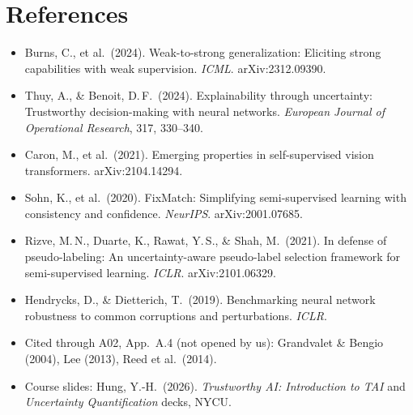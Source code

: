 \documentclass[10pt,a4paper]{article}
\begin{document}
\section*{References}
\small
\begin{itemize}
\item Burns, C., et al.\ (2024). Weak-to-strong generalization: Eliciting strong capabilities with weak supervision. \emph{ICML}. arXiv:2312.09390.
\item Thuy, A., \& Benoit, D.\,F.\ (2024). Explainability through uncertainty: Trustworthy decision-making with neural networks. \emph{European Journal of Operational Research}, 317, 330--340.
\item Caron, M., et al.\ (2021). Emerging properties in self-supervised vision transformers. arXiv:2104.14294.
\item Sohn, K., et al.\ (2020). FixMatch: Simplifying semi-supervised learning with consistency and confidence. \emph{NeurIPS}. arXiv:2001.07685.
\item Rizve, M.\,N., Duarte, K., Rawat, Y.\,S., \& Shah, M.\ (2021). In defense of pseudo-labeling: An uncertainty-aware pseudo-label selection framework for semi-supervised learning. \emph{ICLR}. arXiv:2101.06329.
\item Hendrycks, D., \& Dietterich, T.\ (2019). Benchmarking neural network robustness to common corruptions and perturbations. \emph{ICLR}.
\item Cited through A02, App.\ A.4 (not opened by us): Grandvalet \& Bengio (2004), Lee (2013), Reed et al.\ (2014).
\item Course slides: Hung, Y.-H.\ (2026). \emph{Trustworthy AI: Introduction to TAI} and \emph{Uncertainty Quantification} decks, NYCU.
\end{itemize}
\end{document}

